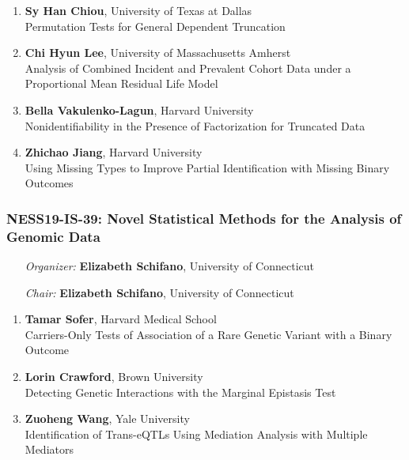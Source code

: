\begin{enumerate}
\item \textbf{Sy Han Chiou}, University of Texas at Dallas \\
Permutation Tests for General Dependent Truncation
\item \textbf{Chi Hyun Lee}, University of Massachusetts Amherst \\
Analysis of Combined Incident and Prevalent Cohort Data under a Proportional Mean Residual Life Model
\item \textbf{Bella Vakulenko-Lagun}, Harvard University \\
Nonidentifiability in the Presence of Factorization for Truncated Data
\item \textbf{Zhichao Jiang}, Harvard University \\
Using Missing Types to Improve Partial Identification with Missing Binary Outcomes
\end{enumerate}

\subsubsection*{NESS19-IS-39: Novel Statistical Methods for the Analysis of Genomic Data}

\begin{enumerate}[align=left]
\item [\emph{Organizer:}] \textbf{Elizabeth Schifano}, University of Connecticut \\
\item [\emph{Chair:}] \textbf{Elizabeth Schifano}, University of Connecticut
\end{enumerate}

\begin{enumerate}
\item \textbf{Tamar Sofer}, Harvard Medical School \\
Carriers-Only Tests of Association of a Rare Genetic Variant with a Binary Outcome
\item \textbf{Lorin Crawford}, Brown University \\
Detecting Genetic Interactions with the Marginal Epistasis Test
\item \textbf{Zuoheng Wang}, Yale University \\
Identification of Trans-eQTLs Using Mediation Analysis with Multiple Mediators
\end{enumerate}

